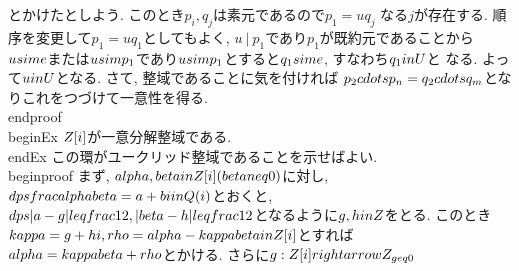  とかけたとしよう. このとき$p_{i}, q_{j}$は素元であるので$p_{1}=uq_{j}$
 なる$j$が存在する. 順序を変更して$p_{1}=uq_{1}$としてもよく,
 $u~|~p_{1}$であり$p_{1}$が既約元であることから$u\\sim e$または$u\\sim
 p_{1}$であり$u\\sim p_{1}$とすると$q_{1}\\sim e$, すなわち$q_{1}\\in U$と
 なる. よって$u\\in U$となる. さて, 整域であることに気を付ければ
 $p_{2}\\cdots p_{n}=q_{2}\\cdots q_{m}$となりこれをつづけて一意性を得る.
\\end{proof}
\\begin{Ex}
 $\\Z[i]$が一意分解整域である.
\\end{Ex}
 この環がユークリッド整域であることを示せばよい.
\\begin{proof}
 まず, $\\alpha, \\beta\\in\\Z[i](\\beta\\neq0)$に対し, $\\dps
 \\frac{\\alpha}{\\beta}=a+bi\\in\\Q(i)$とおくと, $\\dps|a-g|\\leq \\frac{1}{2},
 |\\beta-h|\\leq \\frac{1}{2}$となるように$g, h\\in \\Z$をとる. このとき
 $\\kappa=g+hi, \\rho=\\alpha-\\kappa\\beta\\in\\Z[i]$とすれば
 $\\alpha=\\kappa\\beta+\\rho$とかける. さらに$g:\\Z[i]\\rightarrow \\Z_{\\geq0}$
